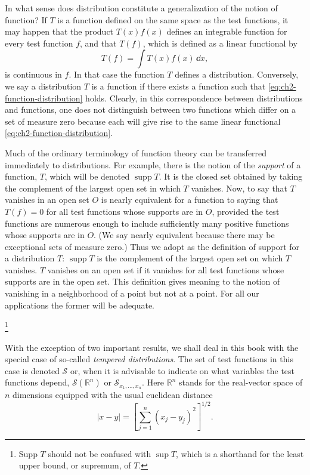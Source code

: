 In what sense does distribution constitute a generalization of the notion of
function? If $T$ is a function defined on the same space as the test
functions, it may happen that the product $T(x)f(x)$ defines an integrable
function for every test function $f$, and that $T(f)$, which is defined as a
linear functional by
\begin{equation}
  T(f)=\int T(x)f(x)\,\dd x,
\tag{2-3}\label{eq:ch2-function-distribution}
\end{equation}
is continuous in $f$. In that case the function $T$ defines a distribution.
Conversely, we say a distribution $T$ is a function if there exists a function
such that \eqref{eq:ch2-function-distribution} holds. Clearly, in this correspondence between distributions
and functions, one does not distinguish between two functions which differ on
a set of measure zero because each will give rise to the same linear
functional \eqref{eq:ch2-function-distribution}.

Much of the ordinary terminology of function theory can be transferred
immediately to distributions. For example, there is the notion of the
\emph{support} of a function, $T$, which will be denoted $\operatorname{supp}T$.
It is the closed set obtained by taking the complement of the largest open set
in which $T$ vanishes. Now, to say that $T$ vanishes in an open set $O$ is
nearly equivalent for a function to saying that $T(f)=0$ for all test
functions whose supports are in $O$, provided the test functions are numerous
enough to include sufficiently many positive functions whose supports are in
$O$. (We say nearly equivalent because there may be exceptional sets of
measure zero.) Thus we adopt as the definition of support for a distribution
$T$: $\operatorname{supp}T$ is the complement of the largest open set on which
$T$ vanishes. $T$ vanishes on an open set if it vanishes for all test functions
whose supports are in the open set. This definition gives meaning to the
notion of vanishing in a neighborhood of a point but not at a point. For all
our applications the former will be adequate.

\footnote{Supp $T$ should not be confused with $\sup T$, which is a shorthand
for the least upper bound, or supremum, of $T$.}

With the exception of two important results, we shall deal in this book with
the special case of so-called \emph{tempered distributions}. The set of test
functions in this case is denoted $\mathcal{S}$ or, when it is advisable to
indicate on what variables the test functions depend,
$\mathcal{S}(\mathbb{R}^n)$ or $\mathcal{S}_{x_1,\ldots,x_n}$. Here
$\mathbb{R}^n$ stands for the real-vector space of $n$ dimensions equipped
with the usual euclidean distance
\begin{equation*}
  |x-y|=\left[\sum_{j=1}^n(x_j-y_j)^2\right]^{1/2}.
\end{equation*}


